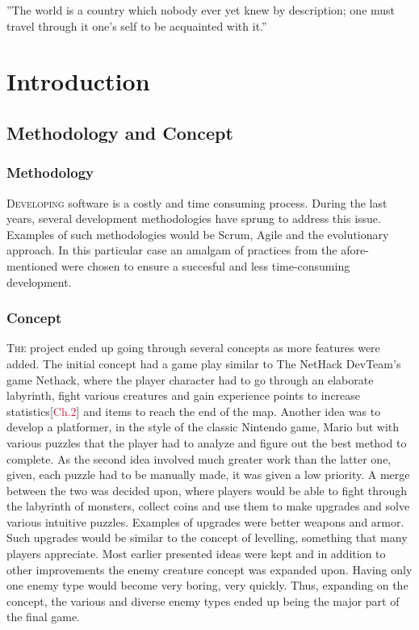 \begin{savequote}[75mm] 
”The world is a country which nobody ever yet knew by description; one must travel through it one's self to be acquainted with it.”
\end{savequote}

\chapter{Introduction} %
\section{Methodology and Concept}
\subsection{Methodology}
\lettrine[lines=1]{\color{Crimson}D}{eveloping} software is a costly and time consuming process. During the last years, several development methodologies have sprung to address this issue. Examples of such methodologies would be Scrum, Agile and the evolutionary approach. In this particular case an amalgam of practices from the afore-mentioned were chosen to ensure a succesful and less time-consuming development.
\newpage
\subsection{Concept}
\lettrine[lines=1]{\color{Crimson}T}{he} project ended up going through several concepts as more features were added. The initial concept had a game play similar to The NetHack DevTeam's game Nethack\cite{c.nethack}, where the player character had to go through an elaborate labyrinth, fight various creatures and gain experience points to increase statistics[\textcolor{Crimson}{Ch.2}] and items to reach the end of the map. Another idea was to develop a platformer, in the style of the classic Nintendo game, Mario but with various puzzles that the player had to analyze and figure out the best method to complete. As the second idea involved much greater work than the latter one, given, each puzzle had to be manually made, it was given a low priority. A merge between the two was decided upon, where players would be able to fight through the labyrinth of monsters, collect coins and use them to make upgrades and solve various intuitive puzzles. Examples of upgrades were better weapons and armor. Such upgrades would be similar to the concept of levelling, something that many players appreciate. Most earlier presented ideas were kept and in addition to other improvements the enemy creature concept was expanded upon. Having only one enemy type would become very boring, very quickly. Thus, expanding on the concept, the various and diverse enemy types ended up being the major part of the final game.
\afterpage{\clearpage}